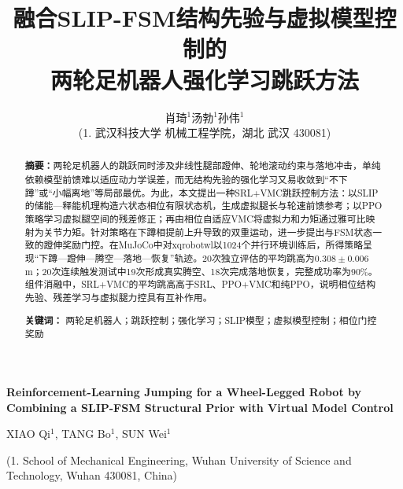 \documentclass[12pt,a4paper,fontset=fandol]{ctexart}
\title{\heiti\zihao{3} 融合SLIP-FSM结构先验与虚拟模型控制的\\两轮足机器人强化学习跳跃方法}
\author{
    \zihao{4}
    肖琦$^{1}$\quad 汤勃$^{1}$\quad 孙伟$^{1}$ \\
    {\zihao{-5} (1. 武汉科技大学 机械工程学院，湖北 武汉 430081)}
}
\date{}
\numberwithin{equation}{section}
\numberwithin{figure}{section}
\numberwithin{table}{section}
\begin{document}
\maketitle
\thispagestyle{fancy}

\begin{abstract}
\noindent\textbf{摘要：}两轮足机器人的跳跃同时涉及非线性腿部蹬伸、轮地滚动约束与落地冲击，单纯依赖模型前馈难以适应动力学误差，而无结构先验的强化学习又易收敛到“不下蹲”或“小幅离地”等局部最优。为此，本文提出一种SRL+VMC跳跃控制方法：以SLIP的储能—释能机理构造六状态相位有限状态机，生成虚拟腿长与轮速前馈参考；以PPO策略学习虚拟腿空间的残差修正；再由相位自适应VMC将虚拟力和力矩通过雅可比映射为关节力矩。针对策略在下蹲相提前上升导致的双重运动，进一步提出与FSM状态一致的蹬伸奖励门控。在MuJoCo中对xqrobotwl以1024个并行环境训练后，所得策略呈现“下蹲—蹬伸—腾空—落地—恢复”轨迹。20次独立评估的平均跳高为$0.308\pm0.006$\,m；20次连续触发测试中19次形成真实腾空、18次完成落地恢复，完整成功率为90\%。组件消融中，SRL+VMC的平均跳高高于SRL、PPO+VMC和纯PPO，说明相位结构先验、残差学习与虚拟腿力控具有互补作用。
\par\noindent\textbf{关键词：} 两轮足机器人；跳跃控制；强化学习；SLIP模型；虚拟模型控制；相位门控奖励
\end{abstract}

\begin{center}
{\large\bfseries Reinforcement-Learning Jumping for a Wheel-Legged Robot by Combining a SLIP-FSM Structural Prior with Virtual Model Control}

\vspace{0.3cm}
{\normalsize XIAO Qi$^{1}$, TANG Bo$^{1}$, SUN Wei$^{1}$}

{\small (1. School of Mechanical Engineering, Wuhan University of Science and Technology, Wuhan 430081, China)}
\end{center}
\end{document}
